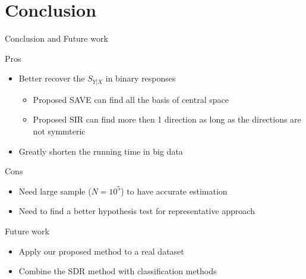 \documentclass[ignorenonframetext,]{beamer}
\providecommand{\tightlist}{%
  \setlength{\itemsep}{0pt}\setlength{\parskip}{0pt}}
\begin{document}
\section{Conclusion}\label{conclusion}

\begin{frame}{Conclusion and Future work}

\begin{block}{Pros}

\begin{itemize}
\tightlist
\item
  Better recover the \(S_{Y|X}\) in binary responses

  \begin{itemize}
  \tightlist
  \item
    Proposed SAVE can find all the basis of central space
  \item
    Proposed SIR can find more then 1 direction as long as the
    directions are not symmteric
  \end{itemize}
\item
  Greatly shorten the running time in big data
\end{itemize}

\end{block}

\begin{block}{Cons}

\begin{itemize}
\tightlist
\item
  Need large sample (\(N = 10^5\)) to have accurate estimation
\item
  Need to find a better hypothesis test for representative approach
\end{itemize}

\end{block}

\end{frame}

\begin{frame}{Future work}

\begin{itemize}
\tightlist
\item
  Apply our proposed method to a real dataset
\item
  Combine the SDR method with classification methods
\end{itemize}

\end{frame}
\end{document}
